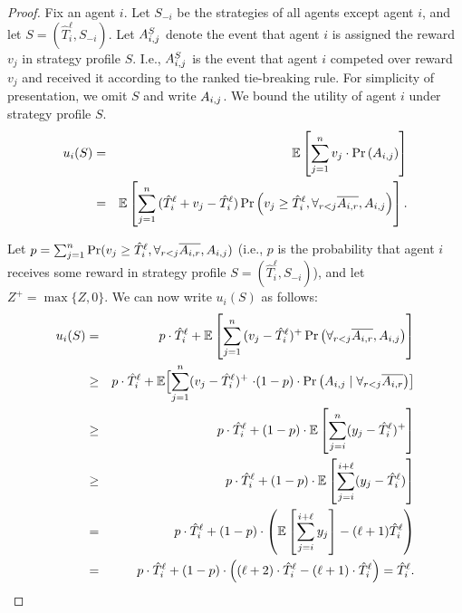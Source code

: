 \begin{proof}
	Fix an agent $i$. Let $S_{-i}$ be the strategies of all agents except agent $i$, and let $S=(\hat{T}_i^\ell,S_{-i})$.
	Let $\assignn{i}{j}{S}$ denote the event that agent $i$ is assigned the reward $v_j$ in strategy profile $S$. I.e., $\assignn{i}{j}{S}$ is the event that agent $i$ competed over reward $v_j$ and received it according to the ranked tie-breaking rule. 
	For simplicity of presentation, we omit $S$ and write $\assign{i}{j}$.
	We bound the utility of agent $i$ under strategy profile $S$.
	\begin{eqnarray*}
	  u_i(S)  & = & \E\left[ \sum_{j=1}^{n}{v_j\cdot\Pr\left(\assign{i}{j}\right)}\right]    \nonumber \\ 
	 & =& \E\left[\sum_{j=1}^{n}{(\hat{T}_i^\ell+v_j-\hat{T}_i^\ell)\Pr\left(v_j\geq \hat{T}_i^\ell,\forall_{r<j} \overline{\assign{i}{r}},\assign{i}{j}\right)}\right]. \nonumber 
	\end{eqnarray*}

Let $p=\sum_{j=1}^{n} \Pr(v_j\geq \hat{T}_i^\ell,\forall_{r<j}  \overline{\assign{i}{r}},\assign{i}{j})$ (i.e., $p$ is the probability that agent $i$ receives some reward in strategy profile $S=(\hat{T}_i^\ell,S_{-i})$), and let $Z^{+}=\max\{Z,0\}$.
We can now write $u_i(S)$ as follows:
\begin{eqnarray}
	 u_i(S)	  & = & p \cdot\hat{T}_i^\ell + \E\left[\sum_{j=1}^{n}{(v_j-\hat{T}_i^\ell)^+\Pr\left(\forall_{r<j} \overline{\assign{i}{r}},\assign{i}{j}\right)}\right] \nonumber \\
	& \geq & p \cdot  \hat{T}_i^\ell \label{eq:1} + \E\Bigl[\sum_{j=1}^{n}(v_j-\hat{T}_i^\ell)^+ \Bigr.  
	 \left. \cdot (1-p)\cdot\Pr\left(\assign{i}{j} \mid \forall_{r<j}\overline{\assign{i}{r}}\right)\right] \nonumber\\
	& \geq & p\cdot \hat{T}_i^\ell + (1-p)\cdot \E\left[\sum_{j=i}^{n}(y_j-\hat{T}_i^\ell)^+\right] \label{eq:2}\\
	& \geq & p\cdot \hat{T}_i^\ell + (1-p)\cdot \E\left[\sum_{j=i}^{i+\ell}(y_j-\hat{T}_i^\ell)\right] \nonumber\\
	& = & p\cdot \hat{T}_i^\ell + (1-p)\cdot \left( \E\left[\sum_{j=i}^{i+\ell}y_j\right]-(\ell+1)\hat{T}_i^\ell \right)\nonumber\\
	& = & p\cdot \hat{T}_i^\ell + (1-p)\cdot \left((\ell+2)\cdot \hat{T}_i^\ell-(\ell+1)\cdot\hat{T}_i^\ell \right) = \hat{T}_i^\ell. \nonumber
	\end{eqnarray}
	

\end{proof}
